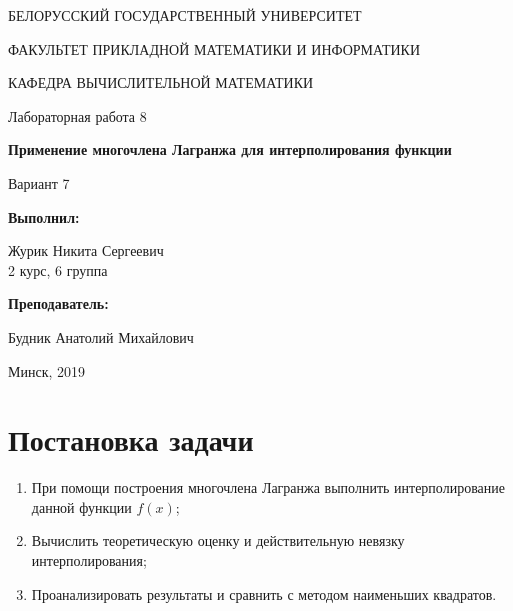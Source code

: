 \documentclass[14pt, a4paper]{article}
\begin{document}
\begin{titlepage}
\begin{center}
\large{БЕЛОРУССКИЙ ГОСУДАРСТВЕННЫЙ УНИВЕРСИТЕТ 

ФАКУЛЬТЕТ ПРИКЛАДНОЙ МАТЕМАТИКИ И ИНФОРМАТИКИ

КАФЕДРА ВЫЧИСЛИТЕЛЬНОЙ МАТЕМАТИКИ}
\end{center}
\vspace*{\fill}
\begin{center}
Лабораторная работа 8

\large{\textbf{Применение многочлена Лагранжа для интерполирования функции}}

Вариант 7
\end{center}
\begin{flushright}
\textbf{Выполнил:}

Журик Никита Сергеевич \\ 2 курс, 6 группа

\textbf{Преподаватель:}

Будник Анатолий Михайлович
\end{flushright}
\vspace*{\fill}
\begin{center}
Минск, 2019
\end{center}
\end{titlepage}

\tableofcontents
\newpage

\newpage
{}

  \section{Постановка задачи}
    \begin{enumerate}
      \item
      При помощи построения многочлена Лагранжа выполнить интерполирование данной функции $f(x)$;
      \item
      Вычислить теоретическую оценку и действительную невязку интерполирования;
      \item
      Проанализировать результаты и сравнить с методом наименьших квадратов.
    \end{enumerate}
\end{document}
